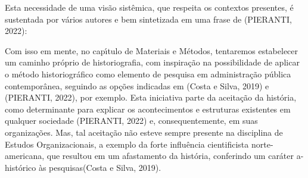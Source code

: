 \documentclass[
12pt,		%
openright,	%
twoside,  %
a4paper,			%
chapter=TITLE,		%
english,			%
french,				%
spanish,			%
brazil				%
]{USPSC-classe/USPSC}
\begin{document}
Esta necessidade de uma vis\~ao sist\^emica, que respeita os contextos presentes, \'e sustentada por v\'arios autores e bem sintetizada em uma frase de (PIERANTI, 2022):


















\noindent\begin{center}\mbox{\centering{}}\end{center}


Com isso em mente, no cap\'{\i}tulo de Materiais e M\'etodos, tentaremos estabelecer um caminho pr\'oprio de historiografia, com inspira\c{c}\~ao na possibilidade de aplicar o m\'etodo historiogr\'afico como elemento de pesquisa em administra\c{c}\~ao p\'ublica contempor\^anea, seguindo as op\c{c}\~oes indicadas em  (Costa e Silva, 2019) e (PIERANTI, 2022), por exemplo. Esta iniciativa parte da aceita\c{c}\~ao da hist\'oria, como determinante para explicar os acontecimentos e estruturas existentes em qualquer sociedade (PIERANTI, 2022) e, consequentemente, em suas organiza\c{c}\~oes. Mas, tal aceita\c{c}\~ao n\~ao esteve sempre presente na disciplina de Estudos Organizacionais, a exemplo da \textquotedbl forte influ\^encia cientificista norte-americana, que resultou em um afastamento da hist\'oria, conferindo um car\'ater a-hist\'orico \`as pesquisas\textquotedbl  (Costa e Silva, 2019).
\end{document}
